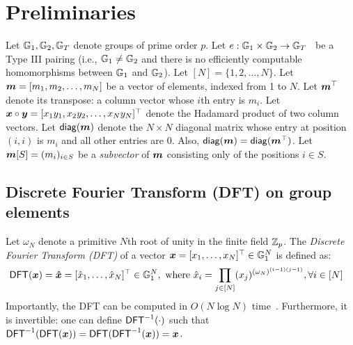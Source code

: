 \section{Preliminaries}

Let $\mathbb{G}_1, \mathbb{G}_2, \mathbb{G}_T$ denote groups of prime order $p$.
Let $e : \mathbb{G}_1 \times \mathbb{G}_2\rightarrow \mathbb{G}_T$~\cite{GPS08} be a Type III pairing (i.e., $\mathbb{G}_1\ne \mathbb{G}_2$ and there is no efficiently computable homomorphisms between $\mathbb{G}_1$ and $\mathbb{G}_2$).
Let $[N] = \{1,2,\dots, N\}$.
Let $\bm{m}=[m_1, m_2, \dots, m_N]$ be a vector of elements, indexed from 1 to $N$.
Let $\bm{m}^\top$ denote its transpose: a column vector whose $i$th entry is $m_i$.
Let $\bm{x}\circ\bm{y} = [x_1 y_1, x_2 y_2,\dots, x_N y_N]^\top$ denote the Hadamard product of two column vectors.
Let $\mathsf{diag}(\bm{m})$ denote the $N\times N$ diagonal matrix whose entry at position $(i,i)$ is $m_i$ and all other entries are 0.
Also, $\mathsf{diag}(\bm{m})=\mathsf{diag}(\bm{m}^\top)$.
Let $\bm{m}[S] = (m_i)_{i \in S}$ be a \textit{subvector} of $\bm{m}$ consisting only of the positions $i\in S$.

\subsection{Discrete Fourier Transform (DFT) on group elements}
\label{s:dft}

Let $\omega_N$ denote a primitive $N$th root of unity in the finite field $\mathbb{Z}_p$.
The \textit{Discrete Fourier Transform (DFT)} of a vector $\bm{x} = [x_1,\dots,x_N]^\top \in \mathbb{G}_1^N$ is defined as:
\begin{align}
    \mathsf{DFT}(\bm{x}) &= \bm{\hat{x}} = [\hat{x}_1, \dots, \hat{x}_N]^\top\in \mathbb{G}_1^N,\ \text{where}\ \hat{x}_i= \prod_{j\in [N]} (x_j)^{(\omega_N)^{(i-1)(j-1)}},\forall i\in[N]
\end{align}
Importantly, the DFT can be computed in $O(N\log{N})$ time~\cite{CLRS09}.
Furthermore, it is invertible: one can define $\mathsf{DFT}^{-1}(\cdot)$ such that $\mathsf{DFT}^{-1}(\mathsf{DFT}(\bm{x})) = \mathsf{DFT}(\mathsf{DFT}^{-1}(\bm{x})) = \bm{x}$.
%

